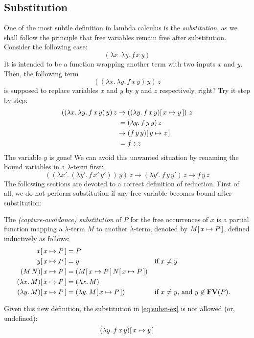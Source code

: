 \subsection{Substitution}
One of the most subtle definition in lambda calculus is the \emph{substitution},
as we shall follow the principle that free variables remain free after
substitution. Consider the following case:
\[
  (\lambda x.\, \lambda y.\, f\,x\, y)
\]
It is intended to be a function wrapping another term with two inputs $x$ and
$y$. Then, the following term
\[
  ((\lambda x.\, \lambda y.\, f\,x\, y)\,y)\,z
\]
is supposed to replace variables $x$ and $y$ by $y$ and $z$ respectively, right? 
Try it step by step:
\begin{align}
 ((\lambda x.\, \lambda y.\, f\,x\, y)\, y)\, z  \to{}
        & ((\lambda y.\, f\,x\,y)[\,x\mapsto y\,])\, \, z  \label{eq:subst-ex} \\
  ={}   & (\lambda y.\, f\,y\,y)\,z \\
  \to{} & (f\,y\,y)[\,y\mapsto z\,] \\
  ={}   & f\,z\,z
\end{align}
The variable $y$ is gone! 
We can avoid this unwanted situation by renaming the bound variables in a
$\lambda$-term first:
\[
  ((\lambda x'.\,(\lambda y'.\, f\,x'\,y'))\, y)\, z
  \to (\lambda y'.\, f\,y\,y')\,z
  \to f\,y\,z
\]
The following sections are devoted to a correct definition of reduction.
First of all, we do not perform substitution if any free variable
becomes bound after substitution:
\begin{definition}
    The \emph{(capture-avoidance) substitution} of $P$ for the free occurrences
    of $x$ is a partial function mapping a $\lambda$-term $M$ to another
    $\lambda$-term, denoted by $M[\,x\mapsto P\,]$, defined inductively as follows:
    \begin{align*}
      x[\,x\mapsto P\,] & = P \\
      y[\,x\mapsto P\,] & = y && \text{if $x \neq y$} \\
      (M\, N)[\,x\mapsto P\,] & = (M[\,x\mapsto P\,]\, N[\,x\mapsto P\,]) \\
      (\lambda x.\, M)[\,x\mapsto P\,] & = (\lambda x.\, M) \\
      (\lambda y.\, M)[\,x\mapsto P\,] & = (\lambda y.\, M[\,x\mapsto P\,])
      && \text{if $x \neq y$, and $y \not\in \mathbf{FV}(P)$.}\\
    \end{align*}
\end{definition}
Given this new definition, the substitution in \eqref{eq:subst-ex} is
not allowed (or, undefined):
\[
  (\lambda y.\, f\,x\,y)[\,x\mapsto y\,]
\]
